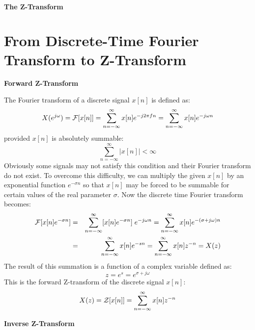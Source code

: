 \textheight 9in
\textwidth 6.5in
\topmargin 0in
\oddsidemargin 0in
\evensidemargin -0.5in
\usepackage{html}

\begin{center}
{\LARGE \bf The Z-Transform}
\end{center}

\section*{From Discrete-Time Fourier Transform to Z-Transform}

{\bf Forward Z-Transform}

The Fourier transform of a discrete signal $x[n]$ is defined as:
\[ X(e^{j\omega})={\cal F}[x[n]]=\sum_{n=-\infty}^\infty x[n]e^{-j2\pi f n}
=\sum_{n=-\infty}^\infty x[n]e^{-j\omega n} \]
provided $x[n]$ is absolutely summable:
\[ \sum_{n=-\infty}^\infty | x[n] |<\infty \]
Obviously some signals may not satisfy this condition and their Fourier transform
do not exist. To overcome this difficulty, we can multiply the given $x[n]$
by an exponential function $e^{-\sigma n}$ so that $x[n]$ may be forced to be
summable for certain values of the real parameter $\sigma$. Now the discrete
time Fourier transform becomes:
\begin{eqnarray}
  {\cal F}[x[n]e^{-\sigma n}]&=&\sum_{n=-\infty}^\infty [x[n]e^{-\sigma n}]\;e^{-j\omega n}
  =\sum_{n=-\infty}^\infty x[n]e^{-(\sigma +j\omega) n}
  \nonumber \\
  &=&\sum_{n=-\infty}^\infty x[n]e^{-s n}=\sum_{n=-\infty}^\infty x[n] z^{-n}
  =X(z)
  \nonumber 
\end{eqnarray}
The result of this summation is a function of a complex variable defined as:
\[ z=e^s=e^{\sigma+j\omega} \]
This is the forward Z-transform of the discrete signal $x[n]$:
\[ X(z)={\cal Z}[x[n]]=\sum_{n=-\infty}^\infty x[n] z^{-n} \]

{\bf Inverse Z-Transform}

